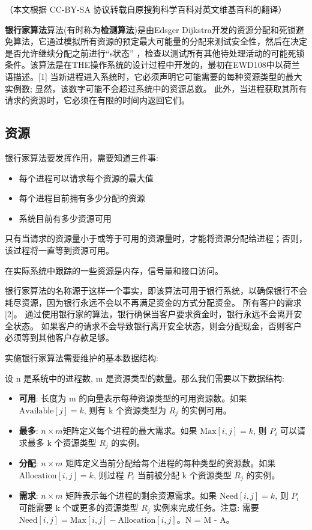 
（本文根据 CC-BY-SA 协议转载自原搜狗科学百科对英文维基百科的翻译）

\textbf{银行家算法}算法(有时称为\textbf{检测算法})是由Edsger Dijkstra开发的资源分配和死锁避免算法，它通过模拟所有资源的预定最大可能量的分配来测试安全性，然后在决定是否允许继续分配之前进行“s状态” ，检查以测试所有其他待处理活动的可能死锁条件。该算法是在THE操作系统的设计过程中开发的，最初在EWD108中以荷兰语描述。[1] 当新进程进入系统时，它必须声明它可能需要的每种资源类型的最大实例数; 显然，该数字可能不会超过系统中的资源总数。 此外，当进程获取其所有请求的资源时，它必须在有限的时间内返回它们。

\subsection{资源}
银行家算法要发挥作用，需要知道三件事:
\begin{itemize}
\item 每个进程可以请求每个资源的最大值
\item 每个进程目前拥有多少分配的资源
\item 系统目前有多少资源可用
\end{itemize}
只有当请求的资源量小于或等于可用的资源量时，才能将资源分配给进程；否则，该过程将一直等到资源可用。

在实际系统中跟踪的一些资源是内存，信号量和接口访问。

银行家算法的名称源于这样一个事实，即该算法可用于银行系统，以确保银行不会耗尽资源，因为银行永远不会以不再满足资金的方式分配资金。 所有客户的需求[2]。 通过使用银行家的算法，银行确保当客户要求资金时，银行永远不会离开安全状态。 如果客户的请求不会导致银行离开安全状态，则会分配现金，否则客户必须等到其他客户存款足够。

实施银行家算法需要维护的基本数据结构:

设 n 是系统中的进程数, m 是资源类型的数量。那么我们需要以下数据结构:

\begin{itemize}
    \item \textbf{可用}: 长度为 m 的向量表示每种资源类型的可用资源数。如果 $\text{Available}[j] = k$, 则有 k 个资源类型为 $R_j$ 的实例可用。
    \item \textbf{最多}: $n \times m$矩阵定义每个进程的最大需求。如果 $\text{Max}[i, j] = k$, 则 $P_i$ 可以请求最多 k 个资源类型 $R_j$ 的实例。
    \item \textbf{分配}: $n \times m$ 矩阵定义当前分配给每个进程的每种类型的资源数。如果 $\text{Allocation}[i, j] = k$, 则过程 $P_i$ 当前被分配 k 个资源类型 $R_j$ 的实例。
    \item \textbf{需求}: $n \times m$ 矩阵表示每个进程的剩余资源需求。如果 $\text{Need}[i, j] = k$, 则 $P_i$ 可能需要 k 个或更多的资源类型 $R_j$ 实例来完成任务。注意: 需要 $\text{Need}[i, j] = \text{Max}[i, j] - \text{Allocation}[i, j]$。N = M - A。
\end{itemize}

